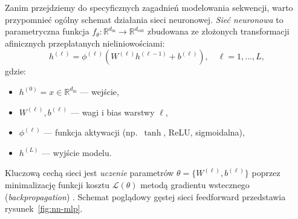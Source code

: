 \documentclass[12pt,a4paper]{article}
\begin{document}
Zanim przejdziemy do specyficznych zagadnień modelowania sekwencji, warto przypomnieć ogólny schemat działania sieci neuronowej. \emph{Sieć neuronowa} to parametryczna funkcja $f_\theta: \mathbb{R}^{d_{\text{in}}} \to \mathbb{R}^{d_{\text{out}}}$ zbudowana ze złożonych transformacji afinicznych przeplatanych nieliniowościami:
\begin{equation}
    h^{(\ell)} = \phi^{(\ell)}\!\left(W^{(\ell)} h^{(\ell-1)} + b^{(\ell)}\right),\quad \ell = 1,\dots,L,
\end{equation}
gdzie:
\begin{itemize}[leftmargin=1.5em]
    \item $h^{(0)} = x \in \mathbb{R}^{d_{\text{in}}}$ --- wejście,
    \item $W^{(\ell)}, b^{(\ell)}$ --- wagi i bias warstwy $\ell$,
    \item $\phi^{(\ell)}$ --- funkcja aktywacji (np.\ $\tanh$, ReLU, sigmoidalna),
    \item $h^{(L)}$ --- wyjście modelu.
\end{itemize}
Kluczową cechą sieci jest \emph{uczenie} parametrów $\theta = \{W^{(\ell)}, b^{(\ell)}\}$ poprzez minimalizację funkcji kosztu $\mathcal{L}(\theta)$ metodą gradientu wstecznego (\emph{backpropagation}) \citep{rumelhart1986backprop}. Schemat poglądowy gęstej sieci feedforward przedstawia rysunek~\ref{fig:nn-mlp}.
\end{document}
